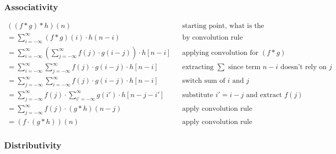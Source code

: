 \documentclass[11pt]{article}
\begin{document}
\subsubsection{Associativity}

\begin{definition}
    \begin{align*}
        ((f\ast g) \ast h)(n)                                                            &  & \text{starting point, what is the convoution at position n?}               \\
        = \sum^\infty_{i=-\infty}(f \ast g)(i) \cdot h(n-i)                              &  & \text{by convolution rule}                                                 \\
        = \sum^\infty_{i=-\infty}(\sum^\infty_{j=-\infty}f(j) \cdot g(i-j)) \cdot h[n-i] &  & \text{applying convolution for } (f \ast g)                                \\
        = \sum^\infty_{i=-\infty}\sum^\infty_{j=-\infty}f(j) \cdot g(i-j) \cdot h[n-i]   &  & \text{extracting } \sum \text{ since term } n-i \text{ doesn't rely on } j \\
        = \sum^\infty_{j=-\infty}\sum^\infty_{i=-\infty}f(j) \cdot g(i-j) \cdot h[n-i]   &  & \text{switch sum of } i \text{ and } j                                     \\
        = \sum^\infty_{j=-\infty}f(j) \cdot\sum^\infty_{i'=-\infty}g(i') \cdot h[n-j-i'] &  & \text{substitute } i'=i-j \text{ and extract } f(j)                        \\
        = \sum^\infty_{j=-\infty}f(j) \cdot (g \ast h)(n-j)                              &  & \text{apply convolution rule}                                              \\
        = (f \cdot (g \ast h))(n)                                                        &  & \text{apply convolution rule}
    \end{align*}
\end{definition}

\subsubsection{Distributivity}
\end{document}
